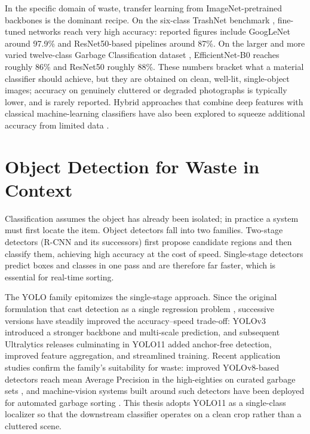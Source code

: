 In the specific domain of waste, transfer learning from ImageNet-pretrained backbones is the dominant recipe. On the six-class TrashNet benchmark \cite{trashnet}, fine-tuned networks reach very high accuracy: reported figures include GoogLeNet around 97.9\% and ResNet50-based pipelines around 87\%. On the larger and more varied twelve-class Garbage Classification dataset \cite{garbage12}, EfficientNet-B0 reaches roughly 86\% and ResNet50 roughly 88\%. These numbers bracket what a material classifier should achieve, but they are obtained on clean, well-lit, single-object images; accuracy on genuinely cluttered or degraded photographs is typically lower, and is rarely reported. Hybrid approaches that combine deep features with classical machine-learning classifiers have also been explored to squeeze additional accuracy from limited data \cite{hybridmlwaste}.

\section{Object Detection for Waste in Context}
Classification assumes the object has already been isolated; in practice a system must first locate the item. Object detectors fall into two families. Two-stage detectors (R-CNN and its successors) first propose candidate regions and then classify them, achieving high accuracy at the cost of speed. Single-stage detectors predict boxes and classes in one pass and are therefore far faster, which is essential for real-time sorting.

The YOLO family epitomizes the single-stage approach. Since the original formulation that cast detection as a single regression problem \cite{yolo}, successive versions have steadily improved the accuracy--speed trade-off: YOLOv3 \cite{yolov3} introduced a stronger backbone and multi-scale prediction, and subsequent Ultralytics releases culminating in YOLO11 \cite{yolo11} added anchor-free detection, improved feature aggregation, and streamlined training. Recent application studies confirm the family's suitability for waste: improved YOLOv8-based detectors reach mean Average Precision in the high-eighties on curated garbage sets \cite{yolov8sci,hybridyolocnn}, and machine-vision systems built around such detectors have been deployed for automated garbage sorting \cite{wmsystem}. This thesis adopts YOLO11 as a single-class localizer so that the downstream classifier operates on a clean crop rather than a cluttered scene.

